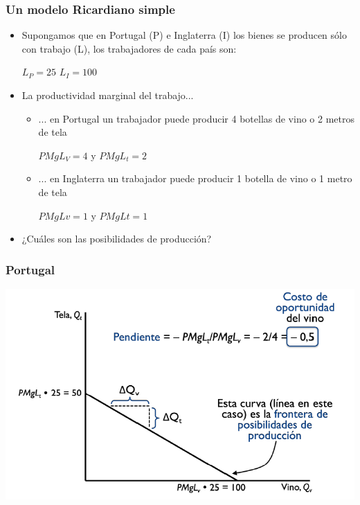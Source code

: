 \documentclass{beamer}
\begin{document}
\begin{frame}
    \frametitle{Un modelo Ricardiano simple}
    \begin{itemize}
        \item Supongamos que en Portugal (P) e Inglaterra (I) los bienes se producen sólo con trabajo (L), los trabajadores de cada país son:
            \begin{center}
                $L_P=25$
                $L_I=100$
            \end{center}

            \item La productividad marginal del trabajo... 
            \begin{itemize}
                \item ... en Portugal un trabajador puede producir 4 botellas de vino o 2 metros de tela \\\vspace{2mm}
                \begin{center}
                    $PMgL_V = 4$ y $PMgL_t = 2$
                \end{center}
                \item ... en Inglaterra un trabajador puede producir 1 botella de vino o 1 metro de tela \\\vspace{2mm}
                \begin{center}
                    $PMgLv = 1$ y $PMgLt = 1$
                \end{center}
            \end{itemize} 
        \item ¿Cuáles son las posibilidades de producción?    
    \end{itemize} 
\end{frame}

\begin{frame}
\frametitle{Portugal}
\centering
\includegraphics[scale=0.6]{../Figures/Tema_03_1_portugal.png}
\end{frame}
\end{document}

